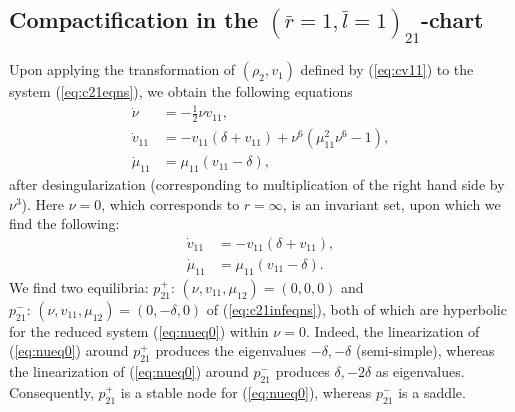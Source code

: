 \documentclass[reqno,12pt]{amsart}
\newcommand{\seclab}[1]{\label{sec:#1}}
\newcommand{\eqlab}[1]{\label{eq:#1}}
\renewcommand{\eqref}[1]{(\ref{eq:#1})}
\numberwithin{equation}{section}
\begin{document}
\subsection{Compactification in the $(\bar r=1,\bar l=1)_{21}$-chart}\seclab{inf1}
Upon applying the transformation of $(\rho_2,v_1)$ defined by \eqref{cv11} to the system \eqref{c21eqns}, we obtain the following equations
\begin{equation}\eqlab{c21infeqns}
\begin{aligned}
  \dot \nu &= - \frac12 \nu v_{11},\\
  \dot v_{11} &= -v_{11}(\delta+v_{11})+\nu^6 (\mu_{11}^2\nu^6-1),\\
  \dot \mu_{11} &= \mu_{11} (v_{11}-\delta),
\end{aligned}
\end{equation}
after desingularization (corresponding to multiplication of the right hand side by $\nu^3$). Here $\nu=0$, which corresponds to $r=\infty$, is an invariant set, upon which we find the following:
\begin{equation}\eqlab{nueq0}
\begin{aligned}
 \dot v_{11} &= -v_{11}(\delta+v_{11}),\\
 \dot \mu_{11} &= \mu_{11} (v_{11}-\delta).
 \end{aligned}
 \end{equation}
 We find two equilibria: $p_{21}^+:\,(\nu,v_{11},\mu_{12})=(0,0,0)$ and $p_{21}^-:\,(\nu,v_{11},\mu_{12})=(0,-\delta,0)$ of \eqref{c21infeqns}, both of which are hyperbolic for the reduced system \eqref{nueq0} within $\nu=0$. Indeed, the linearization of \eqref{nueq0} around $p_{21}^+$ produces the eigenvalues  $-\delta,-\delta$ (semi-simple), whereas the linearization of \eqref{nueq0} around $p_{21}^-$ produces $\delta,-2 \delta$ as eigenvalues. Consequently, $p_{21}^+$ is a stable node for \eqref{nueq0}, whereas $p_{21}^-$ is a saddle. 
  
\end{document}
